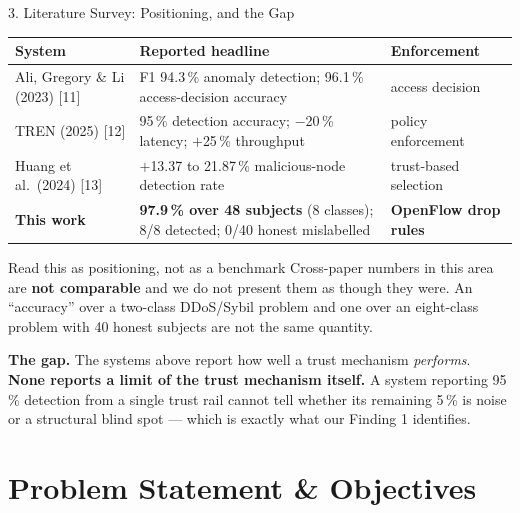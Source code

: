 \documentclass[aspectratio=169, 11pt]{beamer}
\begin{document}
\begin{frame}{3. Literature Survey: Positioning, and the Gap}
    \centering\scriptsize
    \begin{tabular}{@{}p{}p{}p{}@{}}
      \toprule
      \textbf{System} & \textbf{Reported headline} & \textbf{Enforcement}\\
      \midrule
      Ali, Gregory \& Li (2023) [11] & F1 94.3\,\% anomaly detection; 96.1\,\% access-decision accuracy & access decision\\
      TREN (2025) [12]               & 95\,\% detection accuracy; $-$20\,\% latency; $+$25\,\% throughput & policy enforcement\\
      Huang et al.\ (2024) [13]      & $+$13.37 to 21.87\,\% malicious-node detection rate & trust-based selection\\
      \textbf{This work}             & \textbf{97.9\,\% over 48 subjects} (8 classes); 8/8 detected; 0/40 honest mislabelled & \textbf{OpenFlow drop rules}\\
      \bottomrule
    \end{tabular}

    \vspace{5pt}
    \begin{block}{\scriptsize Read this as positioning, not as a benchmark}
      \scriptsize
      Cross-paper numbers in this area are \textbf{not comparable} and we do not
      present them as though they were. An ``accuracy'' over a two-class
      DDoS/Sybil problem and one over an eight-class problem with 40 honest
      subjects are not the same quantity.
    \end{block}

    \vspace{3pt}
    \scriptsize
    \textbf{The gap.} The systems above report how well a trust mechanism
    \emph{performs}. \textbf{None reports a limit of the trust mechanism itself.}
    A system reporting 95\,\% detection from a single trust rail cannot tell
    whether its remaining 5\,\% is noise or a structural blind spot ---
    which is exactly what our Finding 1 identifies.
\end{frame}

\section{Problem Statement \& Objectives}
\end{document}
